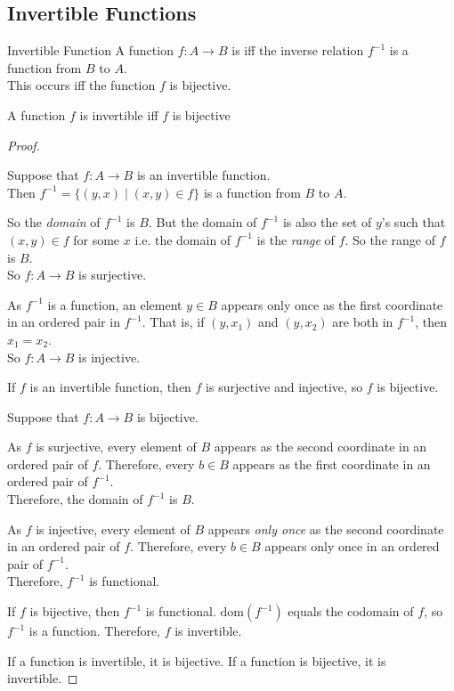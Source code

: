 \documentclass[\main/notes.tex]{subfiles}
\begin{document}
			\subsection{Invertible Functions}
				\begin{definition}{Invertible Function}
					A function $f: A \rightarrow B$ is  iff the inverse relation $f^{-1}$ is a function from $B$ to $A$.\\
					This occurs iff the function $f$ is bijective.
				\end{definition}
				\begin{theorem}{A function $f$ is invertible iff $f$ is bijective}
					\begin{proof}
						$ $
						\begin{indentparagraph}
							\begin{subproof}[Subproof]
								Suppose that $f: A \rightarrow B$ is an invertible function.\\
								Then $f^{-1} = \bigl\{(y, x) \mid (x, y) \in f\bigr\}$ is a function from $B$ to $A$.

								So the \emph{domain} of $f^{-1}$ is $B$. But the domain of $f^{-1}$ is also the set of $y$'s such that $(x, y) \in f$ for some $x$ i.e. the domain of $f^{-1}$ is the \emph{range} of $f$. So the range of $f$ is $B$.\\
								So $f: A \rightarrow B$ is surjective.

								As $f^{-1}$ is a function, an element $y \in B$ appears only once as the first coordinate in an ordered pair in $f^{-1}$. That is, if $(y, x_{1})$ and $(y, x_{2})$ are both in $f^{-1}$, then $x_{1} = x_{2}$.\\
								So $f: A \rightarrow B$ is injective.

								If $f$ is an invertible function, then $f$ is surjective and injective, so $f$ is bijective.
							\end{subproof}
							\begin{subproof}[Subproof]
								Suppose that $f: A \rightarrow B$ is bijective.

								As $f$ is surjective, every element of $B$ appears as the second coordinate in an ordered pair of $f$. Therefore, every $b \in B$ appears as the first coordinate in an ordered pair of $f^{-1}$.\\
								Therefore, the domain of $f^{-1}$ is $B$.

								As $f$ is injective, every element of $B$ appears \emph{only once} as the second coordinate in an ordered pair of $f$. Therefore, every $b \in B$ appears only once in an ordered pair of $f^{-1}$.\\
								Therefore, $f^{-1}$ is functional.

								If $f$ is bijective, then $f^{-1}$ is functional. $\mathrm{dom}(f^{-1})$ equals the codomain of $f$, so $f^{-1}$ is a function. Therefore, $f$ is invertible.
							\end{subproof}
						\end{indentparagraph}
						If a function is invertible, it is bijective. If a function is bijective, it is invertible.
					\end{proof}
				\end{theorem}
\end{document}

